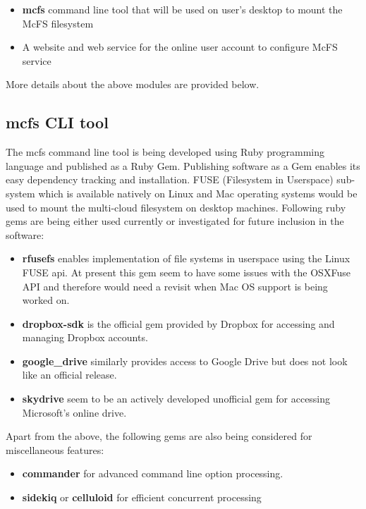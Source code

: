 \begin{itemize}
	\item \textbf{mcfs} command line tool that will be used on user's desktop to mount the McFS filesystem
	\item A website and web service for the online user account to configure McFS service
\end{itemize}

More details about the above modules are provided below.

\subsection{mcfs CLI tool}
The mcfs command line tool is being developed using Ruby programming language and published as a Ruby Gem. Publishing software as a Gem enables its easy dependency tracking and installation. FUSE (Filesystem in Userspace) sub-system which is available natively on Linux and Mac operating systems would be used to mount the multi-cloud filesystem on desktop machines. Following ruby gems are being either used currently or investigated for future inclusion in the software:

\begin{itemize}
	\item \textbf{rfusefs} enables implementation of file systems in userspace using the Linux FUSE api. At present this gem seem to have some issues with the OSXFuse API and therefore would need a revisit when Mac OS support is being worked on.
	\item \textbf{dropbox-sdk} is the official gem provided by Dropbox for accessing and managing Dropbox accounts.
	\item \textbf{google\_drive} similarly provides access to Google Drive but does not look like an official release.
	\item \textbf{skydrive} seem to be an actively developed unofficial gem for accessing Microsoft's online drive.
\end{itemize}

Apart from the above, the following gems are also being considered for miscellaneous features:

\begin{itemize}
	\item \textbf{commander} for advanced command line option processing.
	\item \textbf{sidekiq} or \textbf{celluloid} for efficient concurrent processing
\end{itemize}

